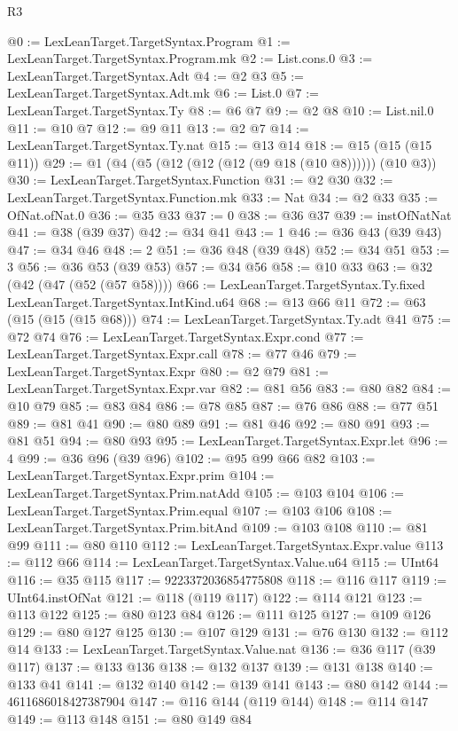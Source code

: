 \begin{lexlean}{R3}
\begin{coremodule}
@0 := LexLeanTarget.TargetSyntax.Program
@1 := LexLeanTarget.TargetSyntax.Program.mk
@2 := List.cons.{0}
@3 := LexLeanTarget.TargetSyntax.Adt
@4 := @2 @3
@5 := LexLeanTarget.TargetSyntax.Adt.mk
@6 := List.{0}
@7 := LexLeanTarget.TargetSyntax.Ty
@8 := @6 @7
@9 := @2 @8
@10 := List.nil.{0}
@11 := @10 @7
@12 := @9 @11
@13 := @2 @7
@14 := LexLeanTarget.TargetSyntax.Ty.nat
@15 := @13 @14
@18 := @15 (@15 (@15 @11))
@29 := @1 (@4 (@5 (@12 (@12 (@12 (@9 @18 (@10 @8)))))) (@10 @3))
@30 := LexLeanTarget.TargetSyntax.Function
@31 := @2 @30
@32 := LexLeanTarget.TargetSyntax.Function.mk
@33 := Nat
@34 := @2 @33
@35 := OfNat.ofNat.{0}
@36 := @35 @33
@37 := 0
@38 := @36 @37
@39 := instOfNatNat
@41 := @38 (@39 @37)
@42 := @34 @41
@43 := 1
@46 := @36 @43 (@39 @43)
@47 := @34 @46
@48 := 2
@51 := @36 @48 (@39 @48)
@52 := @34 @51
@53 := 3
@56 := @36 @53 (@39 @53)
@57 := @34 @56
@58 := @10 @33
@63 := @32 (@42 (@47 (@52 (@57 @58))))
@66 := LexLeanTarget.TargetSyntax.Ty.fixed LexLeanTarget.TargetSyntax.IntKind.u64
@68 := @13 @66 @11
@72 := @63 (@15 (@15 (@15 @68)))
@74 := LexLeanTarget.TargetSyntax.Ty.adt @41
@75 := @72 @74
@76 := LexLeanTarget.TargetSyntax.Expr.cond
@77 := LexLeanTarget.TargetSyntax.Expr.call
@78 := @77 @46
@79 := LexLeanTarget.TargetSyntax.Expr
@80 := @2 @79
@81 := LexLeanTarget.TargetSyntax.Expr.var
@82 := @81 @56
@83 := @80 @82
@84 := @10 @79
@85 := @83 @84
@86 := @78 @85
@87 := @76 @86
@88 := @77 @51
@89 := @81 @41
@90 := @80 @89
@91 := @81 @46
@92 := @80 @91
@93 := @81 @51
@94 := @80 @93
@95 := LexLeanTarget.TargetSyntax.Expr.let
@96 := 4
@99 := @36 @96 (@39 @96)
@102 := @95 @99 @66 @82
@103 := LexLeanTarget.TargetSyntax.Expr.prim
@104 := LexLeanTarget.TargetSyntax.Prim.natAdd
@105 := @103 @104
@106 := LexLeanTarget.TargetSyntax.Prim.equal
@107 := @103 @106
@108 := LexLeanTarget.TargetSyntax.Prim.bitAnd
@109 := @103 @108
@110 := @81 @99
@111 := @80 @110
@112 := LexLeanTarget.TargetSyntax.Expr.value
@113 := @112 @66
@114 := LexLeanTarget.TargetSyntax.Value.u64
@115 := UInt64
@116 := @35 @115
@117 := 9223372036854775808
@118 := @116 @117
@119 := UInt64.instOfNat
@121 := @118 (@119 @117)
@122 := @114 @121
@123 := @113 @122
@125 := @80 @123 @84
@126 := @111 @125
@127 := @109 @126
@129 := @80 @127 @125
@130 := @107 @129
@131 := @76 @130
@132 := @112 @14
@133 := LexLeanTarget.TargetSyntax.Value.nat
@136 := @36 @117 (@39 @117)
@137 := @133 @136
@138 := @132 @137
@139 := @131 @138
@140 := @133 @41
@141 := @132 @140
@142 := @139 @141
@143 := @80 @142
@144 := 4611686018427387904
@147 := @116 @144 (@119 @144)
@148 := @114 @147
@149 := @113 @148
@151 := @80 @149 @84

\end{coremodule}
\end{lexlean}
